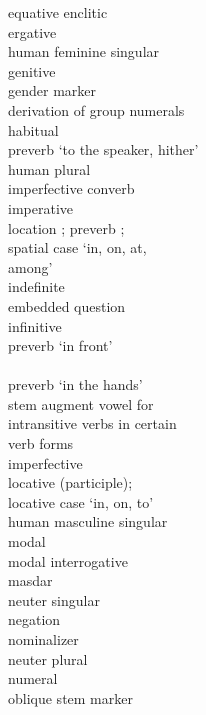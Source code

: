 \begin{multicols}{2}
\begin{tabbing}
				\>	equative enclitic\\
				\>	ergative\\
				\>	human feminine singular\\
				\>	genitive\\
				\> gender marker\\
				\> derivation of group numerals\\
				\>	habitual\\
				\>	preverb `to the speaker, hither'\\
				\>	human plural\\
				\>	imperfective converb\\
				\>	imperative\\
				\>	location \sqt{in}; preverb ;\\
			{}		\>	    spatial case `in, on, at, \\ \> among' \\
				\>	indefinite\\
				\>	embedded question\\
				\>	infinitive\\
				\>	preverb `in front'\\
				\>	\\
						\> preverb `in the hands'\\
				\>	stem augment vowel for \\ \> intransitive verbs in certain \\ \> verb forms\\
				\>	imperfective\\
				\>	locative (participle);\\
			{}		\>	locative case `in, on, to'\\
					\>	human masculine singular\\
				\>	modal\\
				\>	modal interrogative\\
				\>	masdar\\
					\>	neuter singular\\
				\>	negation\\
				\>	nominalizer\\
				\>	neuter plural\\
				\>	numeral\\
				\>	oblique stem marker\\

\end{tabbing}
\end{multicols}
